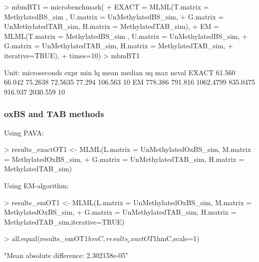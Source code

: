 \documentclass{article}
\begin{document}
\begin{Schunk}
\begin{Sinput}
>  mbmBT1 = microbenchmark(
+     EXACT = MLML(T.matrix = MethylatedBS_sim , U.matrix = UnMethylatedBS_sim,
+                  G.matrix = UnMethylatedTAB_sim, H.matrix = MethylatedTAB_sim),
+     EM =    MLML(T.matrix = MethylatedBS_sim , U.matrix = UnMethylatedBS_sim,
+                  G.matrix = UnMethylatedTAB_sim, H.matrix = MethylatedTAB_sim,
+                  iterative=TRUE),
+     times=10)
>  mbmBT1
\end{Sinput}
\begin{Soutput}
Unit: microseconds
  expr     min      lq      mean   median      uq      max neval
 EXACT  61.560  66.042   75.2638  72.5635  77.294  106.563    10
    EM 778.386 791.816 1062.4799 835.0475 916.937 2030.559    10
\end{Soutput}
\end{Schunk}


\subsubsection{oxBS and TAB methods}

 Using PAVA:
\begin{Schunk}
\begin{Sinput}
>  results_exactOT1 <- MLML(L.matrix = UnMethylatedOxBS_sim, M.matrix = MethylatedOxBS_sim,
+  G.matrix = UnMethylatedTAB_sim, H.matrix = MethylatedTAB_sim)
\end{Sinput}
\end{Schunk}

 Using EM-algorithm:
\begin{Schunk}
\begin{Sinput}
>  results_emOT1 <- MLML(L.matrix = UnMethylatedOxBS_sim, M.matrix = MethylatedOxBS_sim,
+  G.matrix = UnMethylatedTAB_sim, H.matrix = MethylatedTAB_sim,iterative=TRUE)
\end{Sinput}
\end{Schunk}


\begin{Schunk}
\begin{Sinput}
>  all.equal(results_emOT1$hmC,results_exactOT1$hmC,scale=1)
\end{Sinput}
\begin{Soutput}
[1] "Mean absolute difference: 2.302158e-05"
\end{Soutput}
\end{Schunk}
\end{document}
